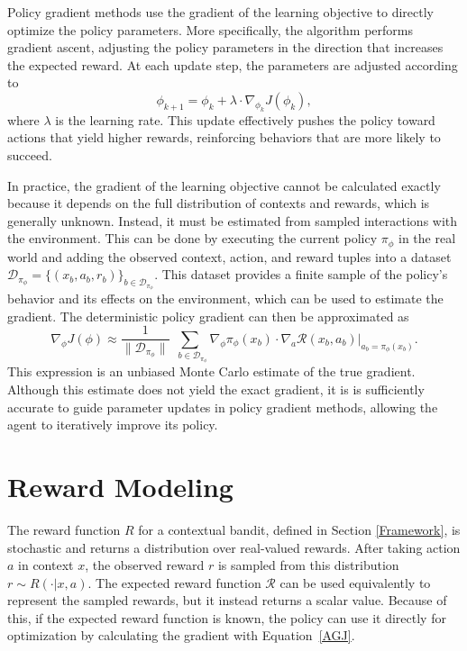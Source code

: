 \documentclass[./dissertation.tex]{subfiles}
\begin{document}
Policy gradient methods use the gradient of the learning objective to directly optimize the policy parameters. More specifically, the algorithm performs gradient ascent, adjusting the policy parameters in the direction that increases the expected reward. At each update step, the parameters are adjusted according to 
\begin{equation}
\label{eq:policy_update}
\phi_{k+1} = \phi_k + \lambda \cdot \nabla_{\phi_k} J(\phi_k),
\end{equation}
where $\lambda$ is the learning rate. This update effectively pushes the policy toward actions that yield higher rewards, reinforcing behaviors that are more likely to succeed.

In practice, the gradient of the learning objective cannot be calculated exactly because it depends on the full distribution of contexts and rewards, which is generally unknown. Instead, it must be estimated from sampled interactions with the environment. This can be done by executing the current policy $\pi_\phi$ in the real world and adding the observed context, action, and reward tuples into a dataset $\mathcal{D}_{\pi_\phi}=\{(x_b,a_b,r_b)\}_{b \in \mathcal{D}_{\pi_\phi}}$. This dataset provides a finite sample of the policy's behavior and its effects on the environment, which can be used to estimate the gradient. The deterministic policy gradient can then be approximated as
\begin{equation}
\nabla_\phi J(\phi) \approx  
\frac{1}{\|\mathcal{D}_{\pi_\phi}\|} \sum_{\ \ \ b \in \mathcal{D}_{\pi_\phi}}
\nabla_\phi \pi_\phi(x_b) \cdot 
\nabla_a \mathcal{R}(x_b,a_b) \big|_{a_b=\pi_\phi(x_b)}.
\label{AGJ}
\end{equation}
This expression is an unbiased Monte Carlo estimate of the true gradient. Although this estimate does not yield the exact gradient, it is is sufficiently accurate to guide parameter updates in policy gradient methods, allowing the agent to iteratively improve its policy.

\section{Reward Modeling}
\label{RFM}
The reward function $R$ for a contextual bandit, defined in Section \ref{Framework}, is stochastic and returns a distribution over real-valued rewards. After taking action $a$ in context $x$, the observed reward $r$ is sampled from this distribution $r \sim R(\cdot|x,a)$. The expected reward function $\mathcal{R}$ can be used equivalently to represent the sampled rewards, but it instead returns a scalar value. Because of this, if the expected reward function is known, the policy can use it directly for optimization by calculating the gradient with Equation~\ref{AGJ}.
\end{document}

